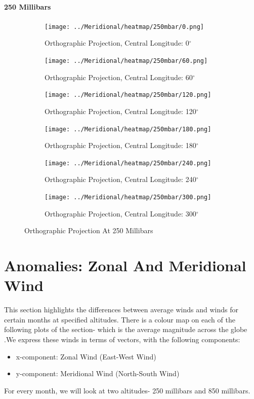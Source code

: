 \documentclass[hidelinks]{article}
\begin{document}
\paragraph{250 Millibars}
\begin{figure}[h!]
	\centering
	\begin{subfigure}[b]{0.45545\linewidth}
		\texttt{[image: ../Meridional/heatmap/250mbar/0.png]}
		\caption{Orthographic Projection, Central Longitude: 0$^\circ$}
	\end{subfigure}
	\begin{subfigure}[b]{0.45545\linewidth}
		\texttt{[image: ../Meridional/heatmap/250mbar/60.png]}
		\caption{Orthographic Projection, Central Longitude: 60$^\circ$}
	\end{subfigure}
	\begin{subfigure}[b]{0.45545\linewidth}
		\texttt{[image: ../Meridional/heatmap/250mbar/120.png]}
		\caption{Orthographic Projection, Central Longitude: 120$^\circ$}
	\end{subfigure}
	\begin{subfigure}[b]{0.45545\linewidth}
		\texttt{[image: ../Meridional/heatmap/250mbar/180.png]}
		\caption{Orthographic Projection, Central Longitude: 180$^\circ$}
	\end{subfigure}
	\begin{subfigure}[b]{0.45545\linewidth}
		\texttt{[image: ../Meridional/heatmap/250mbar/240.png]}
		\caption{Orthographic Projection, Central Longitude: 240$^\circ$}
	\end{subfigure}
	\begin{subfigure}[b]{0.45545\linewidth}
		\texttt{[image: ../Meridional/heatmap/250mbar/300.png]}
		\caption{Orthographic Projection, Central Longitude: 300$^\circ$}
	\end{subfigure}
	\caption{Orthographic Projection At 250 Millibars}
\end{figure}
\newpage
\section{Anomalies: Zonal And Meridional Wind}
This section highlights the differences between average winds and winds for certain months at specified altitudes. There is a colour map on each of the following plots of the section- which is the average magnitude across the globe .We express these winds in terms of vectors, with the following components:
\begin{itemize}
	\item x-component: Zonal Wind (East-West Wind)
	\item y-component: Meridional Wind (North-South Wind)
\end{itemize} 
For every month, we will look at two altitudes- 250 millibars and 850 millibars.
\end{document}

